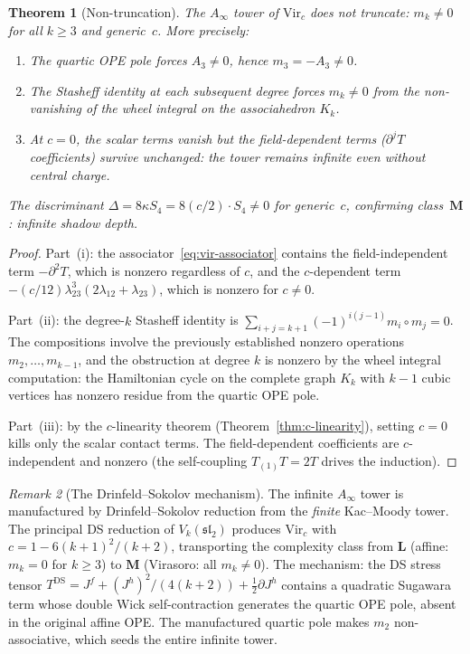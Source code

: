 \documentclass[11pt,reqno]{amsart}
\newtheorem{theorem}{Theorem}[section]
\theoremstyle{definition}
\theoremstyle{remark}
\newtheorem{remark}[theorem]{Remark}
\begin{document}
\begin{theorem}[Non-truncation]
\label{thm:non-truncation}
The\/ $A_\infty$ tower of\/ $\mathrm{Vir}_c$ does not truncate:
$m_k \ne 0$ for all\/ $k \ge 3$ and generic~$c$. More precisely:
\begin{enumerate}[label=\textup{(\roman*)}]
\item The quartic OPE pole forces\/ $A_3 \ne 0$, hence
  $m_3 = -A_3 \ne 0$.
\item The Stasheff identity at each subsequent degree forces
  $m_k \ne 0$ from the non-vanishing of the wheel integral
  on the associahedron $K_k$.
\item At $c = 0$, the scalar terms vanish but the field-dependent
  terms ($\partial^j T$ coefficients) survive unchanged: the tower
  remains infinite even without central charge.
\end{enumerate}
The discriminant\/ $\Delta = 8\kappa S_4 = 8(c/2) \cdot S_4 \ne 0$
for generic~$c$, confirming class~$\mathbf{M}$: infinite shadow
depth.
\end{theorem}

\begin{proof}
Part~(i): the associator~\eqref{eq:vir-associator} contains the
field-independent term $-\partial^2 T$, which is nonzero regardless
of $c$, and the $c$-dependent term
$-(c/12)\lambda_{23}^3(2\lambda_{12}+\lambda_{23})$, which is
nonzero for $c \ne 0$.

Part~(ii): the degree-$k$ Stasheff identity is
$\sum_{i+j=k+1}(-1)^{i(j-1)} m_i \circ m_j = 0$. The
compositions involve the previously established nonzero operations
$m_2, \ldots, m_{k-1}$, and the obstruction at degree $k$ is nonzero
by the wheel integral computation: the Hamiltonian cycle on the
complete graph $K_k$ with $k-1$ cubic vertices has nonzero residue
from the quartic OPE pole.

Part~(iii): by the $c$-linearity theorem (Theorem~\ref{thm:c-linearity}),
setting $c = 0$ kills only the scalar contact terms. The
field-dependent coefficients are $c$-independent and nonzero (the
self-coupling $T_{(1)}T = 2T$ drives the induction).
\end{proof}

\begin{remark}[The Drinfeld--Sokolov mechanism]
\label{rem:ds-mechanism}
The infinite $A_\infty$ tower is manufactured by Drinfeld--Sokolov
reduction from the \emph{finite} Kac--Moody tower. The principal
DS reduction of $V_k(\mathfrak{sl}_2)$ produces $\mathrm{Vir}_c$
with $c = 1 - 6(k+1)^2/(k+2)$, transporting the complexity class
from $\mathbf{L}$ (affine: $m_k = 0$ for $k \ge 3$) to
$\mathbf{M}$ (Virasoro: all $m_k \ne 0$). The mechanism: the DS
stress tensor $T^{\mathrm{DS}} = J^f + (J^h)^2/(4(k+2))
+ \frac{1}{2}\partial J^h$ contains a quadratic Sugawara term whose
double Wick self-contraction generates the quartic OPE pole,
absent in the original affine OPE. The manufactured quartic pole
makes $m_2$ non-associative, which seeds the entire infinite tower.
\end{remark}
\end{document}
